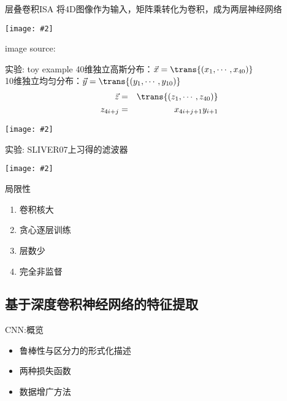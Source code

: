 \documentclass {beamer}
\newcommand{\addgraph}[2]{\begin{center}
\texttt{[image: \#2]}\end{center}}
\begin{document}
\begin{frame}{层叠卷积ISA}
    将4D图像作为输入，矩阵乘转化为卷积，成为两层神经网络
    \addgraph{0.8}{res/isa-stack.png}
    {\tiny image source: \cite{wu2013unsupervised}}
\end{frame}

\begin{frame}{实验: toy example}
    40维独立高斯分布：$\vec{x}=\trans{(x_1,\cdots,x_{40})}$ \\
    10维独立均匀分布：$\vec{y}=\trans{(y_1, \cdots, y_{10})}$
    \begin{eqnarray}
        \vec{z} &=& \trans{(z_1, \cdots, z_{40})} \nonumber \\
        z_{4i+j} &=& x_{4i+j+1}y_{i+1}
    \end{eqnarray}
    \addgraph{0.8}{res/isa-toyeg.eps}
\end{frame}

\begin{frame}{实验: SLIVER07上习得的滤波器}
    \addgraph{0.9}{res/isa-filter.png}
\end{frame}

\begin{frame}{局限性}
    \begin{enumerate}
        \item 卷积核大
        \item 贪心逐层训练
        \item 层数少
        \item 完全非监督
    \end{enumerate}
\end{frame}

\subsection{基于深度卷积神经网络的特征提取}

\begin{frame}{CNN:概览}
    \begin{itemize}
        \item 鲁棒性与区分力的形式化描述
        \item 两种损失函数
        \item 数据增广方法
    \end{itemize}
\end{frame}
\end{document}

